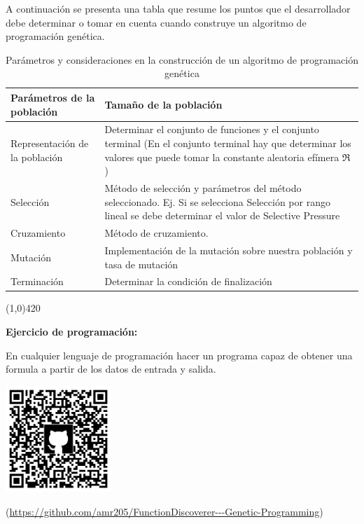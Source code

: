 \documentclass[11pt,fleqn]{book} %
\begin{document}
A continuación se presenta una tabla que resume los puntos que el desarrollador debe determinar o tomar en cuenta cuando construye un algoritmo de programación genética.


\begin{table}[ht!]
\centering
\caption{Parámetros y consideraciones en la construcción de un algoritmo de programación genética}

\begin{tabular}{|p{5cm}|p{9cm}|}
\hline
	Parámetros de la población & Tamaño de la población\\
\hline
	Representación de la población & Determinar el conjunto de funciones y el conjunto terminal (En el conjunto terminal hay que determinar los valores que puede tomar la constante aleatoria efímera $\Re$) \\
\hline
	Selección & Método de selección y parámetros del método seleccionado. Ej. Si se selecciona Selección por rango lineal se debe determinar el valor de Selective Pressure\\
\hline
	Cruzamiento & Método de cruzamiento.\\
\hline
	Mutación & Implementación de la mutación sobre nuestra población y  tasa de mutación\\
\hline
	Terminación & Determinar la condición de finalización\\
\hline

\end{tabular}
\end{table}

\FloatBarrier

\begin{center}
\line(1,0){420}
\end{center}

\textbf{Ejercicio de programación:}

En cualquier lenguaje de programación hacer un programa capaz de obtener una formula a partir de los datos de entrada y salida.

\includegraphics[width=4cm]{Pictures/github/progen.png}

(\url{https://github.com/amr205/FunctionDiscoverer---Genetic-Programming})
\end{document}
